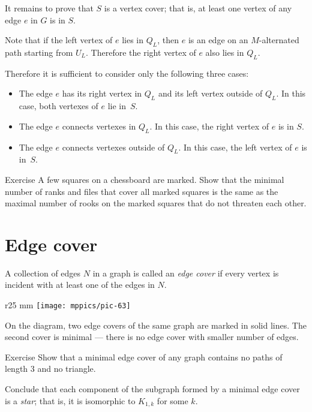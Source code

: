 It remains to prove that $S$ is a vertex cover;
that is, at least one vertex of any edge $e$ in $G$ is in $S$.

Note that if the left vertex of $e$ lies in $Q_L$, then $e$ is an edge on an $M$-alternated path starting from $U_L$. 
Therefore the right vertex of $e$ also lies in $Q_L$.

Therefore it is sufficient to consider only the following three cases:
\begin{itemize}
\item The edge $e$ has
its right vertex in $Q_L$ and its left vertex outside of $Q_L$.
In this case, both vertexes of $e$ lie in~$S$.
\item The edge $e$ connects vertexes in $Q_L$.
In this case, the right vertex of $e$ is in $S$.
\item The edge $e$ connects vertexes outside of $Q_L$. 
In this case, the left vertex of $e$ is in~$S$.
\qeds
\end{itemize}


\begin{thm}{Exercise}
A few squares
 on a chessboard are marked.
Show that the minimal number of ranks and files that cover all marked squares is the same as the maximal number of rooks on the marked squares that do not threaten each other.
\end{thm}

\section*{Edge cover}

A collection of edges $N$ in a graph is called an \emph{edge cover} if every vertex is incident with at least one of the edges in $N$.

\begin{wrapfigure}{r}{25 mm}
\vskip-6mm
\centering
\texttt{[image: mppics/pic-63]}
\vskip0mm
\end{wrapfigure}

On the diagram, two edge covers of the same graph are marked in solid lines.
The second cover is minimal --- there is no edge cover with smaller number of edges.

\begin{thm}{Exercise}\label{ex:monotree}
Show that a minimal edge cover of any graph contains no paths of length 3 and no triangle.

Conclude that each component of the subgraph formed by a minimal edge cover is a \emph{star};
that is, it is isomorphic to $K_{1,k}$ for some $k$. 
\end{thm}


